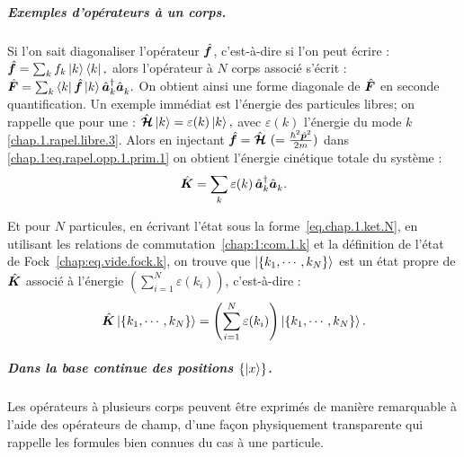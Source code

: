 \begin{mdframed}[
	linewidth=0.5pt, 
	backgroundcolor=gray!5, 
	roundcorner=50pt,	
	innerleftmargin=5pt,
    innerrightmargin=5pt,
    innertopmargin=-10pt,
    innerbottommargin=2pt,
    leftmargin=2pt,
    rightmargin=2pt
	]
\subparagraph{Exemples d’opérateurs à un corps.}

Si l’on sait diagonaliser l’opérateur \( \hat{\bm{f}} \), c’est-à-dire si l’on peut écrire :
\(
	\hat{\bm{f}} = \sum_k f_k \ket{k} \bra{k},
\)
alors l’opérateur à $N$ corps associé s’écrit :
\(
	\hat{\bm{F}} = \sum_k \bra{k} \hat{\bm{f}} \ket{k} \hat{\bm{a}}^\dagger_k \hat{\bm{a}}_k^{}.
\)
On obtient ainsi une forme diagonale de \( \hat{\bm{F}} \) en seconde quantification.
Un exemple immédiat est l'énergie des particules libres; on rappelle que pour une :
\(
	\hat{\bm{\mathcal{H}}} \ket{k} = \varepsilon(k) \ket{k},
\)
avec $\varepsilon(k)$ l'énergie du mode $k$ \eqref{chap.1.rapel.libre.3}.
Alors en injectant $\hat{\bm{f}} = \hat{\bm{\mathcal{H}}} ~( = \frac{ \hbar^2 \hat{\bm{p}}^2}{2m})$ dans \eqref{chap.1:eq.rapel.opp.1.prim.1} on obtient l’énergie cinétique totale du système :
\begin{equation}
	\hat{\bm{K}} = \sum_{k} \varepsilon(k) \, \hat{\bm{a}}^\dagger_k \hat{\bm{a}}_k^{}.\label{eq.chap.1.cinietique.1}
\end{equation}

Et pour $N$ particules, en écrivant l’état sous la forme~\eqref{eq.chap.1.ket.N}, en utilisant les relations de commutation~\eqref{chap:1:com.1.k} et la définition de l’état de Fock~\eqref{chap:eq.vide.fock.k}, on trouve que $\ket{\{k_1, \cdots, k_N\}}$ est un état propre de $\hat{\bm{K}}$ associé à l'énergie $\left( \sum_{i = 1}^N \varepsilon(k_i) \right)$, c’est-à-dire :
\begin{eqnarray}
	\hat{\bm{K}} \ket{\{k_1, \cdots, k_N\}} = \left( \sum_{i = 1}^N \varepsilon(k_i) \right) \ket{\{k_1, \cdots, k_N\}}.\label{eq.chap.1.cinietique.2}
\end{eqnarray}
\end{mdframed}

\subparagraph{Dans la base continue des positions \( \{ \ket{x} \} \).}

Les opérateurs à plusieurs corps peuvent être exprimés de manière remarquable à l’aide des opérateurs de champ, d’une façon physiquement transparente qui rappelle les formules bien connues du cas à une particule.

